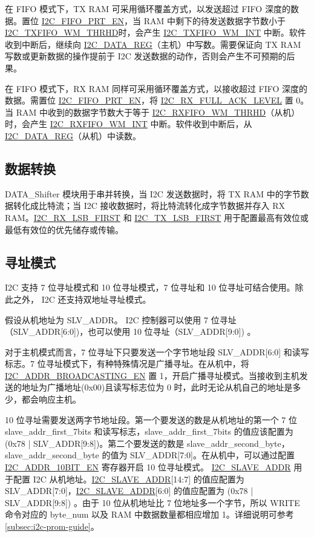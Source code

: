 \documentclass[main\_\_CN.tex]{subfiles}
\begin{document}
在 FIFO 模式下，TX RAM 可采用循环覆盖方式，以发送超过 FIFO 深度的数据。置位 \hyperref[fielddesc:I2CFIFOPRTEN]{I2C\_FIFO\_PRT\_EN}，当 RAM 中剩下的待发送数据字节数小于 \hyperref[fielddesc:I2CTXFIFOWMTHRHD]{I2C\_TXFIFO\_WM\_THRHD}时，会产生 \hyperref[int:i2c-txfifo-wm]{I2C\_TXFIFO\_WM\_INT} 中断。软件收到中断后，继续向 \hyperref[regdesc:I2CDATAREG]{I2C\_DATA\_REG}（主机）中写数。需要保证向 TX RAM 写数或更新数据的操作提前于 I2C 发送数据的动作，否则会产生不可预期的后果。

在 FIFO 模式下，RX RAM 同样可采用循环覆盖方式，以接收超过 FIFO 深度的数据。需置位 \hyperref[fielddesc:I2CFIFOPRTEN]{I2C\_FIFO\_PRT\_EN}，将 \hyperref[fielddesc:I2CRXFULLACKLEVEL]{I2C\_RX\_FULL\_ACK\_LEVEL} 置 0。当 RAM 中收到的数据字节数大于等于 \hyperref[fielddesc:I2CRXFIFOWMTHRHD]{I2C\_RXFIFO\_WM\_THRHD}（从机）时，会产生 \hyperref[int:i2c-rxfifo-wm]{I2C\_RXFIFO\_WM\_INT} 中断。软件收到中断后，从 \hyperref[regdesc:I2CDATAREG]{I2C\_DATA\_REG}（从机）中读数。


\subsection{数据转换}
DATA\_Shifter 模块用于串并转换，当 I2C 发送数据时，将 TX RAM 中的字节数据转化成比特流；当 I2C 接收数据时，将比特流转化成字节数据并存入 RX RAM。\hyperref[fielddesc:I2CRXLSBFIRST]{I2C\_RX\_LSB\_FIRST} 和 \hyperref[fielddesc:I2CTXLSBFIRST]{I2C\_TX\_LSB\_FIRST} 用于配置最高有效位或最低有效位的优先储存或传输。

\subsection{寻址模式}
\chipname{} I2C 支持 7 位寻址模式和 10 位寻址模式，7 位寻址和 10 位寻址可结合使用。除此之外，\chipname{} I2C 还支持双地址寻址模式。

假设从机地址为 SLV\_ADDR。 \chipname{} I2C 控制器可以使用 7 位寻址（SLV\_ADDR[6:0])，也可以使用 10 位寻址（SLV\_ADDR[9:0]) 。

对于主机模式而言，7 位寻址下只要发送一个字节地址段 SLV\_ADDR[6:0] 和读写标志。7 位寻址模式下，有种特殊情况是广播寻址。在从机中，将 \hyperref[fielddesc:I2CADDRBROADCASTINGEN]{I2C\_ADDR\_BROADCASTING\_EN} 置 1，开启广播寻址模式。当接收到主机发送的地址为广播地址(0x00)且读写标志位为 0 时，此时无论从机自己的地址是多少，都会响应主机。

10 位寻址需要发送两字节地址段。第一个要发送的数是从机地址的第一个 7 位 slave\_addr\_first\_7bits 和读写标志，slave\_addr\_first\_7bits 的值应该配置为 (0x78 | SLV\_ADDR[9:8])。第二个要发送的数是 slave\_addr\_second\_byte，slave\_addr\_second\_byte 的值为 SLV\_ADDR[7:0]。在从机中，可以通过配置 \hyperref[fielddesc:I2CADDR10BITEN]{I2C\_ADDR\_10BIT\_EN} 寄存器开启 10 位寻址模式。 \hyperref[fielddesc:I2CSLAVEADDR]{I2C\_SLAVE\_ADDR} 用于配置 I2C 从机地址。\hyperref[fielddesc:I2CSLAVEADDR]{I2C\_SLAVE\_ADDR}[14:7] 的值应配置为 SLV\_ADDR[7:0]，\hyperref[fielddesc:I2CSLAVEADDR]{I2C\_SLAVE\_ADDR}[6:0] 的值应配置为 (0x78 | SLV\_ADDR[9:8]) 。由于 10 位从机地址比 7 位地址多一个字节，所以 WRITE 命令对应的 byte\_num 以及 RAM 中数据数量都相应增加 1。详细说明可参考 \ref{subsec:i2c-prom-guide}。
\end{document}
